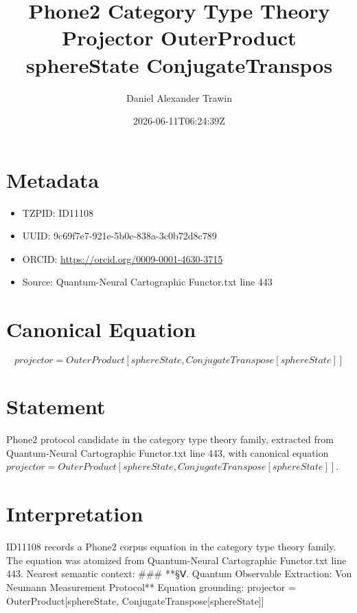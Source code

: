 \documentclass[11pt]{article}
\title{Phone2 Category Type Theory Projector OuterProduct sphereState ConjugateTranspos}
\author{Daniel Alexander Trawin}
\date{2026-06-11T06:24:39Z}
\begin{document}
\maketitle
\section*{Metadata}
\begin{itemize}
\item TZPID: ID11108
\item UUID: 9c69f7e7-921e-5b0c-838a-3c0b72d8c789
\item ORCID: \url{https://orcid.org/0009-0001-4630-3715}
\item Source: Quantum-Neural Cartographic Functor.txt line 443
\end{itemize}
\section*{Canonical Equation}
\[
projector = OuterProduct[sphereState, ConjugateTranspose[sphereState]]
\]
\section*{Statement}
Phone2 protocol candidate in the category type theory family, extracted from Quantum-Neural Cartographic Functor.txt line 443, with canonical equation $projector = OuterProduct[sphereState, ConjugateTranspose[sphereState]]$.
\section*{Interpretation}
ID11108 records a Phone2 corpus equation in the category type theory family. The equation was atomized from Quantum-Neural Cartographic Functor.txt line 443. Nearest semantic context: ### **§Ⅴ. Quantum Observable Extraction: Von Neumann Measurement Protocol** Equation grounding: projector = OuterProduct[sphereState, ConjugateTranspose[sphereState]]
\end{document}
